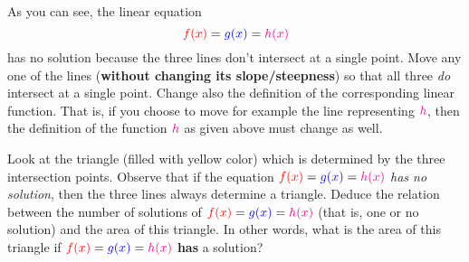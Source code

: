 \documentclass[a4paper,11pt]{article}
\newcommand{\tr}{\textcolor{red}}
\newcommand{\tb}{\textcolor{blue}}
\newcommand{\tm}{\textcolor{magenta}}
\begin{document}
\begin{enumerate}[topsep=0pt,label=\arabic*.]
\begin{center}
 \end{center}
 As you can see, the linear equation
 \[
  \tr{f(x)} = \tb{g(x)} = \tm{h(x)}
 \]
 has no solution because the three lines don't intersect at a single point. Move
 any one of the lines (\textbf{without changing its slope/steepness}) so that
 all three \emph{do} intersect at a single point. Change also the definition of
 the corresponding linear function. That is, if you choose to move for example
 the line representing $\tm{h}$, then the definition of the function $\tm{h}$ as
 given above must change as well.

 Look at the triangle (filled with yellow color) which is determined by the
 three intersection points. Observe that if the equation $\tr{f(x)} = \tb{g(x)}
 = \tm{h(x)}$ \emph{has no solution}, then the three lines always determine a
 triangle. Deduce the relation between the number of solutions of $\tr{f(x)} =
 \tb{g(x)} = \tm{h(x)}$ (that is, one or no solution) and the area of this
 triangle. In other words, what is the area of this triangle if $\tr{f(x)} =
 \tb{g(x)} = \tm{h(x)}$ \textbf{has} a solution?
\end{enumerate}
\end{document}
